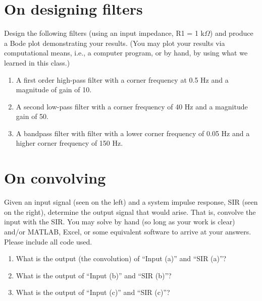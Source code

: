 \documentclass[11pt]{book}
\begin{document}
\section{On designing filters}
Design the following filters (using an input impedance, R1 = 1 k$\Omega$) and produce a Bode plot demonstrating your results. (You may plot your results via computational means, i.e., a computer program, or by hand, by using what we learned in this class.)
\begin{enumerate}
	\item A first order high-pass filter with a corner frequency at 0.5 Hz and a magnitude of gain of 10.
	\item A second low-pass filter with a corner frequency of 40 Hz and a magnitude gain of 50.
	\item A bandpass filter with filter with a lower corner frequency of 0.05 Hz and a higher corner frequency of 150 Hz.
\end{enumerate}


\section{On convolving}

Given an input signal (seen on the left) and a system impulse response, SIR (seen on the right), determine the output signal that would arise. That is, convolve the input with the SIR. You may solve by hand (so long as your work is clear) and/or MATLAB, Excel, or some equivalent software to arrive at your answers. Please include all code used.
\begin{enumerate}
	\item What is the output (the convolution) of ``Input (a)'' and ``SIR (a)''?
	\item What is the output of ``Input (b)'' and ``SIR (b)''?
	\item What is the output of ``Input (c)'' and ``SIR (c)''?
\end{enumerate}
\end{document}
